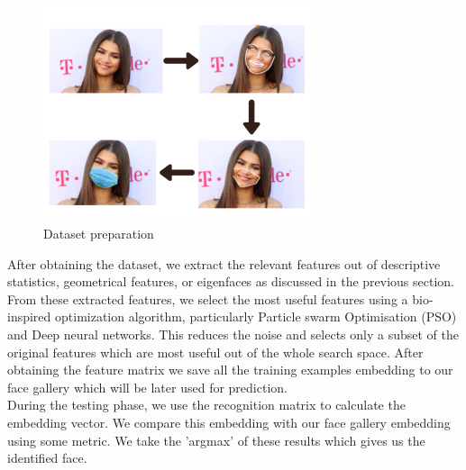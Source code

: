 \documentclass[a4paper,12pt]{report}
\begin{document}
\begin{figure}[h!]
\center
 \includegraphics[width=0.7\textwidth]{images/Dataset preparation.png}
 \caption{Dataset preparation}
\end{figure}

After obtaining the dataset, we extract the relevant features out of descriptive statistics, geometrical features, or eigenfaces as discussed in the previous section. From these extracted features, we select the most useful features using a bio-inspired optimization algorithm, particularly Particle swarm Optimisation (PSO) and Deep neural networks. This reduces the noise and selects only a subset of the original features which are most useful out of the whole search space. After obtaining the feature matrix we save all the training examples embedding to our face gallery which will be later used for prediction. \\

During the testing phase, we use the recognition matrix to calculate the embedding vector. We compare this embedding with our face gallery embedding using some metric. We take the 'argmax' of these results which gives us the identified face.
\end{document}
